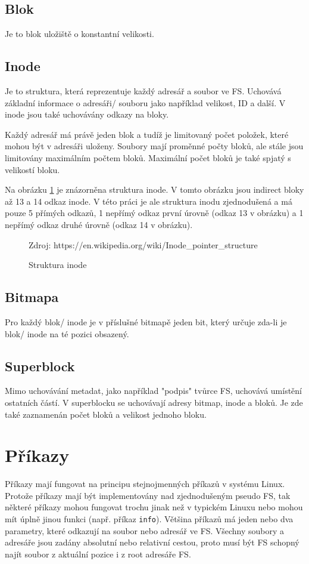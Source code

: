 \documentclass[12pt]{report}
\begin{document}
\subsection{Blok}
Je to blok uložiště o konstantní velikosti.
%
\subsection{Inode}
Je to struktura, která reprezentuje každý adresář a soubor ve FS. Uchovává základní informace o
adresáři/ souboru jako například velikost, ID a další. V inode jsou také uchovávány odkazy na 
bloky.

Každý adresář má právě jeden blok a tudíž je limitovaný počet položek, které mohou být v adresáři
uloženy. Soubory mají proměnné počty bloků, ale stále jsou limitovány maximálním počtem bloků.
Maximální počet bloků je také spjatý s velikostí bloku.

Na obrázku \ref{img:inode_struct} je znázorněna struktura inode. V tomto obrázku jsou indirect
bloky až 13 a 14 odkaz inode. V této práci je ale struktura inodu zjednodušená a má pouze 5
přímých odkazů, 1 nepřímý odkaz první úrovně (odkaz 13 v obrázku) a 1 nepřímý odkaz druhé úrovně
(odkaz 14 v obrázku).

\begin{figure}[H]
	\centering
	\def\svgwidth{\columnwidth}
	
	\caption{Struktura inode}
	Zdroj: https://en.wikipedia.org/wiki/Inode\_pointer\_structure
	\label{img:inode_struct}
\end{figure}
%
\subsection{Bitmapa}
Pro každý blok/ inode je v příslušné bitmapě jeden bit, který určuje zda-li je blok/ inode
na té pozici obsazený.
%
\subsection{Superblock}
Mimo uchovávání metadat, jako například "podpis" tvůrce FS, uchovává umístění ostatních částí.
V superblocku se uchovávají adresy bitmap, inode a bloků. Je zde také zaznamenán počet bloků
a velikost jednoho bloku.
%
\section{Příkazy}
Příkazy mají fungovat na principu stejnojmenných příkazů v systému Linux. Protože příkazy mají být implementovány 
nad zjednodušeným pseudo FS, tak některé příkazy mohou fungovat trochu jinak než v typickém Linuxu nebo
mohou mít úplně jinou funkci (např. příkaz \texttt{info}). Většina příkazů má jeden nebo dva parametry,
které odkazují na soubor nebo adresář ve FS. 
Všechny soubory a adresáře jsou zadány absolutní nebo relativní cestou, proto musí být FS schopný
najít soubor z aktuální pozice i z root adresáře FS.
%
%
%
\end{document}
